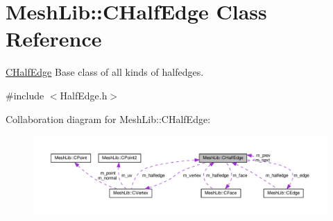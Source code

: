 \hypertarget{class_mesh_lib_1_1_c_half_edge}{}\section{Mesh\+Lib\+:\+:C\+Half\+Edge Class Reference}
\label{class_mesh_lib_1_1_c_half_edge}


\hyperlink{class_mesh_lib_1_1_c_half_edge}{C\+Half\+Edge} Base class of all kinds of halfedges.  




{\ttfamily \#include $<$Half\+Edge.\+h$>$}



Collaboration diagram for Mesh\+Lib\+:\+:C\+Half\+Edge\+:
\nopagebreak
\begin{figure}[H]
\begin{center}
\leavevmode
\includegraphics[width=350pt]{class_mesh_lib_1_1_c_half_edge__coll__graph}
\end{center}
\end{figure}
